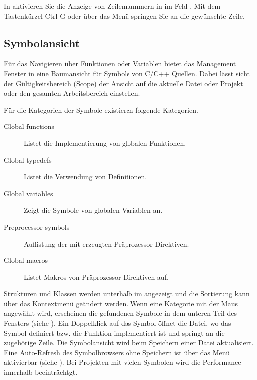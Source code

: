 In \codeblocks aktivieren Sie die Anzeige von Zeilennummern in  im Feld . Mit dem Tastenkürzel Ctrl-G oder über das Menü  springen Sie an die gewünschte Zeile.


\subsection{Symbolansicht}

Für das Navigieren über Funktionen oder Variablen bietet das Management Fenster in \codeblocks eine Baumansicht für Symbole von C/C++ Quellen. Dabei lässt sicht der Gültigkeitsbereich (Scope) der Ansicht auf die aktuelle Datei oder Projekt oder den gesamten Arbeitsbereich einstellen.


Für die Kategorien der Symbole existieren folgende Kategorien.

\begin{description}
\item[Global functions] Listet die Implementierung von globalen Funktionen.
\item[Global typedefs] Listet die Verwendung von  Definitionen.
\item[Global variables] Zeigt die Symbole von globalen Variablen an.
\item[Preprocessor symbols] Auflistung der mit  erzeugten Präprozessor Direktiven.
\item[Global macros] Listet Makros von Präprozessor Direktiven auf.
\end{description}


Strukturen und Klassen werden unterhalb im  angezeigt und die Sortierung kann über das Kontextmenü geändert werden. Wenn eine Kategorie mit der Maus angewählt wird, erscheinen die gefundenen Symbole in dem unteren Teil des Fensters (siehe ). Ein Doppelklick auf das Symbol öffnet die Datei, wo das Symbol definiert bzw. die Funktion implementiert ist und springt an die zugehörige Zeile. Die Symbolansicht wird beim Speichern einer Datei aktualisiert. Eine Auto-Refresh des Symbolbrowsers ohne Speichern ist über das Menü  aktivierbar (siehe ). Bei Projekten mit vielen Symbolen wird die Performance innerhalb \codeblocks beeinträchtgt.

